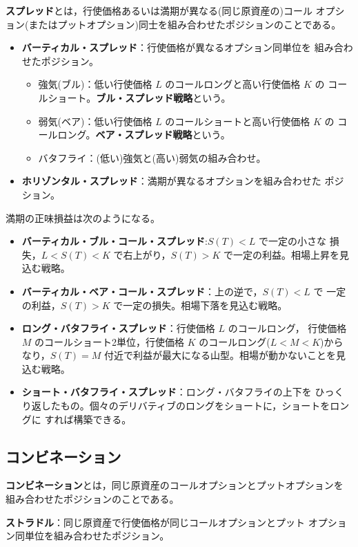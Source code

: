 \begin{definition}[スプレッド]
\textbf{スプレッド}とは，行使価格あるいは満期が異なる(同じ原資産の)コール
オプション(またはプットオプション)同士を組み合わせたポジションのことである。
\begin{itemize}
\item \textbf{バーティカル・スプレッド}：行使価格が異なるオプション同単位を
組み合わせたポジション。
  \begin{itemize}
  \item 強気(ブル)：低い行使価格 $L$ のコールロングと高い行使価格 $K$ の
  コールショート。\textbf{ブル・スプレッド戦略}という。
  \item 弱気(ベア)：低い行使価格 $L$ のコールショートと高い行使価格 $K$ の
  コールロング。\textbf{ベア・スプレッド戦略}という。
  \item バタフライ：(低い)強気と(高い)弱気の組み合わせ。
  \end{itemize}
\item \textbf{ホリゾンタル・スプレッド}：満期が異なるオプションを組み合わせた
ポジション。
\end{itemize}
\end{definition}

満期の正味損益は次のようになる。
\begin{itemize}
\item \textbf{バーティカル・ブル・コール・スプレッド}:$S(T)<L$ で一定の小さな
損失，$L<S(T)<K$ で右上がり，$S(T)>K$ で一定の利益。相場上昇を見込む戦略。
\item \textbf{バーティカル・ベア・コール・スプレッド}：上の逆で，$S(T)<L$ で
一定の利益，$S(T)>K$ で一定の損失。相場下落を見込む戦略。
\item \textbf{ロング・バタフライ・スプレッド}：行使価格 $L$ のコールロング，
行使価格 $M$ のコールショート2単位，行使価格 $K$ のコールロング($L<M<K$)から
なり，$S(T)=M$ 付近で利益が最大になる山型。相場が動かないことを見込む戦略。
\item \textbf{ショート・バタフライ・スプレッド}：ロング・バタフライの上下を
ひっくり返したもの。個々のデリバティブのロングをショートに，ショートをロングに
すれば構築できる。
\end{itemize}

\subsection{コンビネーション}

\begin{definition}[コンビネーション]
\textbf{コンビネーション}とは，同じ原資産のコールオプションとプットオプションを
組み合わせたポジションのことである。

\textbf{ストラドル}：同じ原資産で行使価格が同じコールオプションとプット
オプション同単位を組み合わせたポジション。
\end{definition}

